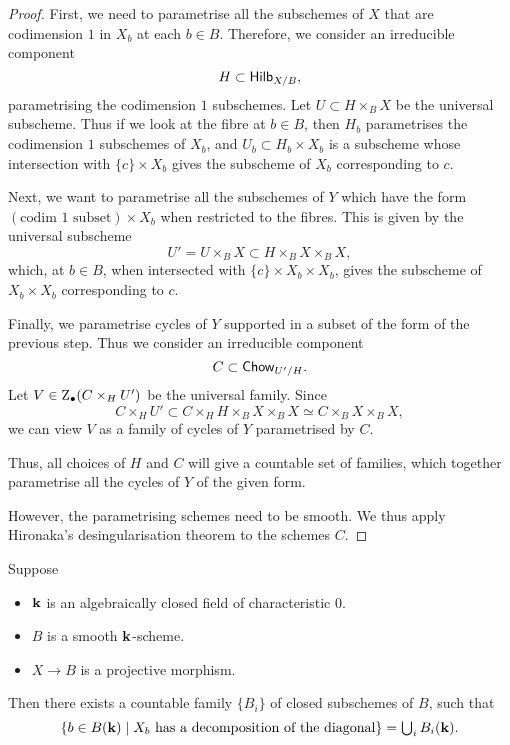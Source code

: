 \begin{proof}
    First, we need to parametrise all the subschemes of $X$
    that are codimension $1$ in $X_b$ at each $b \in B$.
    Therefore, we consider an irreducible component 
    \[ H \subset \textsf{\textup{Hilb}}_{X/B}, \]
    parametrising the codimension $1$ subschemes.
    Let $U \subset H \times_B X$ be the universal subscheme.
    Thus if we look at the fibre at $b \in B$,
    then $H_b$ parametrises the codimension $1$ subschemes of $X_b$,
    and $U_b \subset H_b \times X_b$ is a subscheme
    whose intersection with $\{c\} \times X_b$ gives the subscheme of $X_b$ corresponding to $c$.

    Next, we want to parametrise all the subschemes of $Y$ which
    have the form $(\text{codim 1 subset}) \times X_b$ when restricted to the fibres.
    This is given by the universal subscheme
    \[ U' = U \times_B X \subset H \times_B X \times_B X, \]
    which, at $b \in B$, 
    when intersected with $\{c\} \times X_b \times X_b$,
    gives the subscheme of $X_b \times X_b$ corresponding to $c$.

    Finally, we parametrise cycles of $Y$ supported in
    a subset of the form of the previous step.
    Thus we consider an irreducible component
    \[ C \subset \textsf{\textup{Chow}}_{U'/H}. \]
    Let $V \in \mathrm{Z}_\bullet (C \times_H U')$ be the universal family. Since
    \[ C \times_H U' \subset C \times_H H \times_B X \times_B X \simeq C \times_B X \times_B X, \]
    we can view $V$ as a family of cycles of $Y$ parametrised by $C$.

    Thus, all choices of $H$ and $C$ will give a countable set of families,
    which together parametrise all the cycles of $Y$ of the given form.

    However, the parametrising schemes need to be smooth.
    We thus apply Hironaka's desingularisation theorem to the schemes $C$.
\end{proof}

\begin{proposition} \label{lem-3-locus-decomp}
    Suppose 
    \begin{itemize}
        \item
            $\bbk$ is an algebraically closed field of characteristic $0$.
        \item
            $B$ is a smooth $\bbk$-scheme.
        \item
            $X \to B$ is a projective morphism.
    \end{itemize}
    Then there exists a countable family $\{ B_i \}$
    of closed subschemes of $B$, such that
    \[ \textstyle
        \{ b \in B (\bbk) \mid X_b \text{ has a decomposition of the diagonal} \}
        = \bigcup_i B_i (\bbk).
    \]
\end{proposition}

